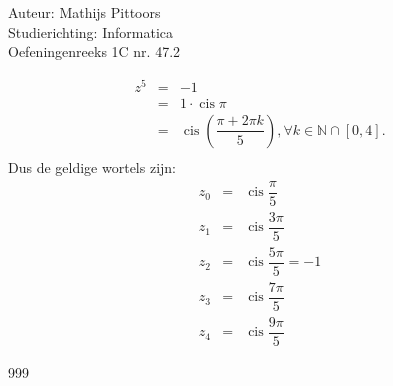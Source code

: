 \documentclass[a4paper]{article}
\newcommand{\cis}{\operatorname{cis}}
\begin{document}
  
\noindent \large Auteur: Mathijs Pittoors \\
\noindent \large Studierichting: Informatica\\
\noindent \large Oefeningenreeks 1C nr. 47.2\\

\medskip

\normalsize

\begin{eqnarray*}
z^5 & = & -1 \\
    & = & 1 \cdot \cis \pi\\
    & = & \cis \left( \dfrac{\pi + 2\pi k}{5} \right), \forall k \in \mathbb{N} \cap [0, 4]. \\
\end{eqnarray*}
Dus de geldige wortels zijn: \\

\begin{eqnarray*}
z_0 & = & \cis \dfrac{\pi}{5} \\
z_1 & = & \cis \dfrac{3\pi}{5} \\
z_2 & = & \cis \dfrac{5\pi}{5} = -1 \\
z_3 & = & \cis \dfrac{7\pi}{5} \\
z_4 & = & \cis \dfrac{9\pi}{5}
\end{eqnarray*}


\begin{thebibliography}{999}
\end{thebibliography}
\end{document}

